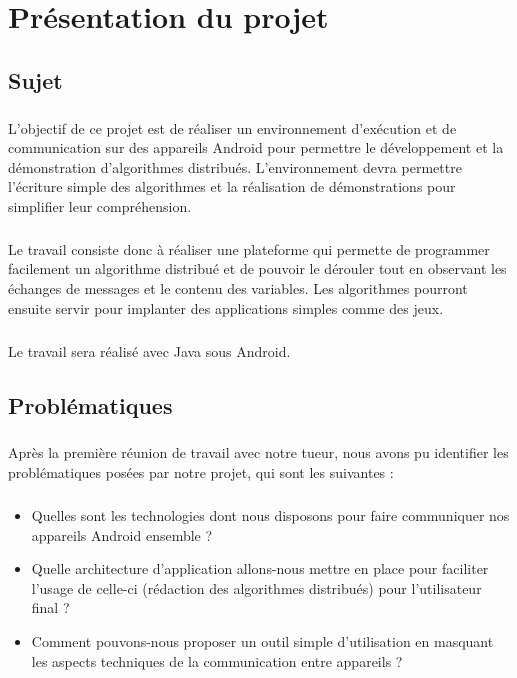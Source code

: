 \documentclass[a4paper,10pt]{report}
\begin{document}
\chapter{Présentation du projet}
  \section{Sujet}
  \paragraph{}
  L’objectif de ce projet est de réaliser un environnement d’exécution et de communication
  sur des appareils Android pour permettre le développement et la démonstration
  d’algorithmes distribués. L’environnement devra permettre l'écriture simple des algorithmes
  et la réalisation de démonstrations pour simplifier leur compréhension.
  \paragraph{}
  Le travail consiste donc à réaliser une plateforme qui permette de programmer facilement un algorithme
  distribué et de pouvoir le dérouler tout en observant les échanges de messages et
  le contenu des variables.
  Les algorithmes pourront ensuite servir pour implanter des applications simples comme
  des jeux. 
  \paragraph{}
  Le travail sera réalisé avec Java sous Android.
  
  \section{Problématiques}
  \paragraph{}
  Après la première réunion de travail avec notre tueur, nous avons pu identifier les problématiques posées par notre projet, qui sont les suivantes :
\paragraph{}
  \begin{itemize}
    \item Quelles sont les technologies dont nous disposons pour faire communiquer nos appareils Android ensemble ?
    \newline
    \item Quelle architecture d'application allons-nous mettre en place pour faciliter l'usage de celle-ci (rédaction des algorithmes distribués) pour l'utilisateur final ?
    \newline
    \item Comment pouvons-nous proposer un outil simple d'utilisation en masquant les aspects techniques de la communication entre appareils ?
  \end{itemize}
\end{document}
